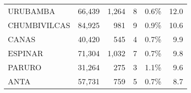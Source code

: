 \begin{tabular}{lrrrrr}
	\cellcolor[HTML]{FFCE93}URUBAMBA     & 66,439                                                         & 1,264                                                                & 8                                                              & 0.6\%                                                                  & 12.0                                                                                                                               \\
	\cellcolor[HTML]{FFCE93}CHUMBIVILCAS  & 84,925                                                         & 981                                                                  & 9                                                              & 0.9\%                                                                  & 10.6                                                                                                                               \\
	\cellcolor[HTML]{9AFF99}CANAS         & 40,420                                                         & 545                                                                  & 4                                                              & 0.7\%                                                                  & 9.9                                                                                                                                \\
	\cellcolor[HTML]{9AFF99}ESPINAR       & 71,304                                                         & 1,032                                                                & 7                                                              & 0.7\%                                                                  & 9.8                                                                                                                                \\
	\cellcolor[HTML]{9AFF99}PARURO        & 31,264                                                         & 275                                                                  & 3                                                              & 1.1\%                                                                  & 9.6                                                                                                                                \\
	\cellcolor[HTML]{9AFF99}ANTA          & 57,731                                                         & 759                                                                  & 5                                                              & 0.7\%                                                                  & 8.7                                                                                                                                \\

\end{tabular}
